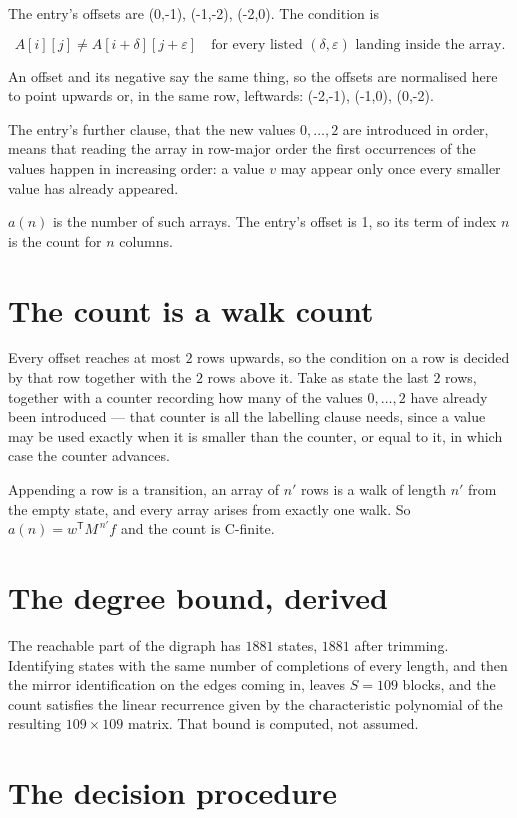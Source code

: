 \documentclass[11pt]{article}
\theoremstyle{definition}
\begin{document}
The entry's offsets are (0,-1), (-1,-2), (-2,0). The condition is

\[A[i][j] \ne A[i{+}\delta][j{+}\varepsilon]\quad\text{for every listed }(\delta,\varepsilon)\text{ landing inside the array.}\]

An offset and its negative say the same thing, so the offsets are normalised here to point upwards or, in the same row, leftwards: (-2,-1), (-1,0), (0,-2).

The entry's further clause, that the new values $0,\dots,2$ are introduced in order, means that reading the array in row-major order the first occurrences of the values happen in increasing order: a value $v$ may appear only once every smaller value has already appeared.

$a(n)$ is the number of such arrays. The entry's offset is 1, so its term of index $n$ is the count for $n$ columns.

\section{The count is a walk count}

Every offset reaches at most $2$ rows upwards, so the condition on a row is decided by that row together with the $2$ rows above it. Take as state the last $2$ rows, together with a counter recording how many of the values $0,\dots,2$ have already been introduced --- that counter is all the labelling clause needs, since a value may be used exactly when it is smaller than the counter, or equal to it, in which case the counter advances.

Appending a row is a transition, an array of $n'$ rows is a walk of length $n'$ from the empty state, and every array arises from exactly one walk. So $a(n) = w^{\mathsf T}M^{\,n'}f$ and the count is C-finite.

\section{The degree bound, derived}

The reachable part of the digraph has $1881$ states, $1881$ after trimming. Identifying states with the same number of completions of every length, and then the mirror identification on the edges coming in, leaves $S = 109$ blocks, and the count satisfies the linear recurrence given by the characteristic polynomial of the resulting $109\times109$ matrix. That bound is computed, not assumed.

\section{The decision procedure}
\end{document}
